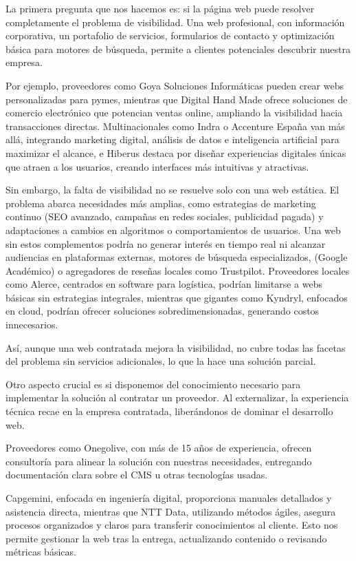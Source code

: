 \documentclass[11.5pt]{article}
\begin{document}
	La primera pregunta que nos hacemos es: si la página web puede resolver completamente el problema de
	visibilidad. Una web profesional, con información corporativa, un portafolio de servicios, formularios de
	contacto y optimización básica para motores de búsqueda, permite a clientes potenciales descubrir nuestra
	empresa.
	
	Por ejemplo, proveedores como Goya Soluciones Informáticas pueden crear webs personalizadas para
	pymes, mientras que Digital Hand Made ofrece soluciones de comercio electrónico que potencian ventas
	online, ampliando la visibilidad hacia transacciones directas. Multinacionales como Indra o Accenture España van más allá, integrando marketing digital, análisis de datos e inteligencia artificial para maximizar el alcance, e Hiberus destaca por diseñar experiencias digitales únicas que atraen a los usuarios, creando interfaces más intuitivas y atractivas.
	
	Sin embargo, la falta de visibilidad no se resuelve solo con una web estática. El problema abarca necesidades más amplias, como estrategias de marketing continuo (SEO avanzado, campañas en redes sociales,
	publicidad pagada) y adaptaciones a cambios en algoritmos o comportamientos de usuarios. Una web sin
	estos complementos podría no generar interés en tiempo real ni alcanzar audiencias en plataformas externas,
	motores de búsqueda especializados, (Google Académico) o agregadores de reseñas locales como Trustpilot.
	Proveedores locales como Alerce, centrados en software para logística, podrían limitarse a webs básicas sin
	estrategias integrales, mientras que gigantes como Kyndryl, enfocados en cloud, podrían ofrecer soluciones
	sobredimensionadas, generando costos innecesarios.
	
	Así, aunque una web contratada mejora la visibilidad, no cubre todas las facetas del problema sin servicios
	adicionales, lo que la hace una solución parcial.
	
	Otro aspecto crucial es si disponemos del conocimiento necesario para implementar la solución al contratar
	un proveedor. Al externalizar, la experiencia técnica recae en la empresa contratada, liberándonos de dominar el desarrollo web.
	
	Proveedores como Onegolive, con más de 15 años de experiencia, ofrecen consultoría para alinear la
	solución con nuestras necesidades, entregando documentación clara sobre el CMS u otras tecnologías
	usadas.
	
	Capgemini, enfocada en ingeniería digital, proporciona manuales detallados y asistencia directa, mientras que NTT Data, utilizando métodos ágiles, asegura procesos organizados y claros para transferir conocimientos al cliente. Esto nos permite gestionar la web tras la entrega, actualizando contenido o revisando métricas básicas.
	
\end{document}
